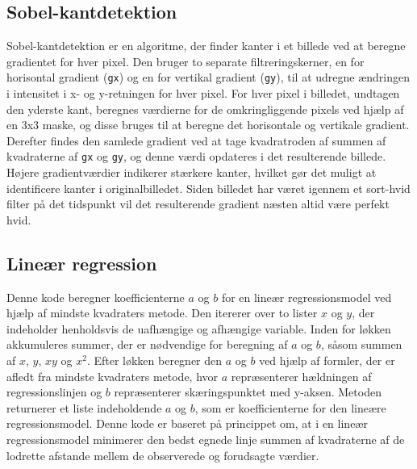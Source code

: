 \documentclass{article}
\begin{document}
\subsection{Sobel-kantdetektion}

Sobel-kantdetektion er en algoritme, der finder kanter i et billede ved at beregne gradientet for hver pixel. Den bruger to separate filtreringskerner, en for horisontal gradient (\texttt{gx}) og en for vertikal gradient (\texttt{gy}), til at udregne ændringen i intensitet i x- og y-retningen for hver pixel. For hver pixel i billedet, undtagen den yderste kant, beregnes værdierne for de omkringliggende pixels ved hjælp af en 3x3 maske, og disse bruges til at beregne det horisontale og vertikale gradient. Derefter findes den samlede gradient ved at tage kvadratroden af summen af kvadraterne af \texttt{gx} og \texttt{gy}, og denne værdi opdateres i det resulterende billede. Højere gradientværdier indikerer stærkere kanter, hvilket gør det muligt at identificere kanter i originalbilledet. Siden billedet har været igennem et sort-hvid filter på det tidspunkt vil det resulterende gradient næsten altid være perfekt hvid.
\newpage
\subsection{Lineær regression}

Denne kode beregner koefficienterne \( a \) og \( b \) for en lineær regressionsmodel ved hjælp af mindste kvadraters metode. Den itererer over to lister \( x \) og \( y \), der indeholder henholdsvis de uafhængige og afhængige variable. Inden for løkken akkumuleres summer, der er nødvendige for beregning af \( a \) og \( b \), såsom summen af \( x \), \( y \), \( xy \) og \( x^2 \). Efter løkken beregner den \( a \) og \( b \) ved hjælp af formler, der er afledt fra mindste kvadraters metode, hvor \( a \) repræsenterer hældningen af regressionslinjen og \( b \) repræsenterer skæringspunktet med y-aksen. Metoden returnerer et liste indeholdende \( a \) og \( b \), som er koefficienterne for den lineære regressionsmodel. Denne kode er baseret på princippet om, at i en lineær regressionsmodel minimerer den bedst egnede linje summen af kvadraterne af de lodrette afstande mellem de observerede og forudsagte værdier.\\\\
\end{document}
